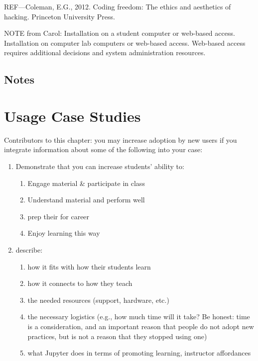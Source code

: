 \documentclass[]{book}
\providecommand{\tightlist}{%
  \setlength{\itemsep}{0pt}\setlength{\parskip}{0pt}}
\begin{document}
REF---Coleman, E.G., 2012. Coding freedom: The ethics and aesthetics of
hacking. Princeton University Press.

NOTE from Carol: Installation on a student computer or web-based access.
Installation on computer lab computers or web-based access. Web-based
access requires additional decisions and system administration
resources.

\section{Notes}\label{notes}

\chapter{Usage Case Studies}\label{case-studies}

Contributors to this chapter: you may increase adoption by new users if
you integrate information about some of the following into your case:

\begin{enumerate}
\def\labelenumi{\arabic{enumi}.}
\tightlist
\item
  Demonstrate that you can increase students' ability to:

  \begin{enumerate}
  \def\labelenumii{\arabic{enumii}.}
  \tightlist
  \item
    Engage material \& participate in class
  \item
    Understand material and perform well
  \item
    prep their for career
  \item
    Enjoy learning this way
  \end{enumerate}
\item
  describe:

  \begin{enumerate}
  \def\labelenumii{\arabic{enumii}.}
  \tightlist
  \item
    how it fits with how their students learn
  \item
    how it connects to how they teach
  \item
    the needed resources (support, hardware, etc.)
  \item
    the necessary logistics (e.g., how much time will it take? Be
    honest: time is a consideration, and an important reason that people
    do not adopt new practices, but is not a reason that they stopped
    using one)
  \item
    what Jupyter does in terms of promoting learning, instructor
    affordances
  \end{enumerate}
\end{enumerate}
\end{document}
